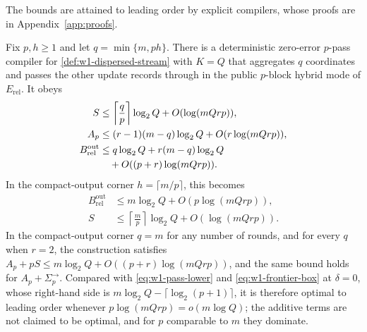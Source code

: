 \label{sec:w1-upper}
The bounds are attained to leading order by explicit compilers, whose
proofs are in Appendix~\ref{app:proofs}.

\begin{proposition}
\label{prop:w1-block-hybrid}
Fix $p,h\geq1$ and let $q=\min\{m,ph\}$.  There is a deterministic
zero-error $p$-pass compiler for \cref{def:w1-dispersed-stream} with
$K=Q$ that
aggregates $q$ coordinates and passes the other update records through in
the public $p$-block hybrid mode of $E_{\mathrm{rel}}$.  It obeys
\begin{align}
 S&\leq \left\lceil\frac qp\right\rceil\log_2Q
       +O(\log(mQrp)),
 \label{eq:w1-upper-state}\\
 A_p&\leq(r-1)(m-q)\log_2Q+O(r\log(mQrp)),
 \label{eq:w1-upper-A}\\
 B_{\mathrm{rel}}^{\mathrm{out}}
 &\leq q\log_2Q+r(m-q)\log_2Q\notag\\
 &\quad+O((p+r)\log(mQrp)).
 \label{eq:w1-upper-output}
\end{align}
In the compact-output corner $h=\lceil m/p\rceil$, this becomes
\begin{align}
 B_{\mathrm{rel}}^{\mathrm{out}}
 &\leq m\log_2Q+O(p\log(mQrp)),\\
 S&\leq\left\lceil\frac mp\right\rceil\log_2Q
       +O(\log(mQrp)).
 \label{eq:w1-compact-upper}
\end{align}
In the compact-output corner $q=m$ for any number of rounds, and for
every $q$ when $r=2$, the construction satisfies
$A_p+pS\leq m\log_2Q+O((p+r)\log(mQrp))$, and the same bound holds for
$A_p+\Sigma^{\to}_p$.  Compared with
\eqref{eq:w1-pass-lower} and \eqref{eq:w1-frontier-box} at $\delta=0$,
whose right-hand side is $m\log_2Q-\lceil\log_2(p+1)\rceil$, it is
therefore optimal to leading order whenever $p\log(mQrp)=o(m\log Q)$; the
additive terms are not claimed to be optimal, and for $p$ comparable to $m$
they dominate.
\end{proposition}


